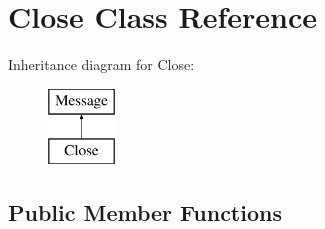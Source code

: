 \hypertarget{class_close}{\section{Close Class Reference}
\label{class_close}
}
Inheritance diagram for Close\-:\begin{figure}[H]
\begin{center}
\leavevmode
\includegraphics[height=2.000000cm]{class_close}
\end{center}
\end{figure}
\subsection*{Public Member Functions}
